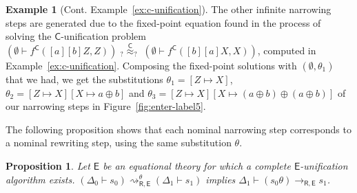 \documentclass[submission,copyright,creativecommons]{eptcs}
\newcommand{\daniele}[1]{\textcolor{cyan}{#1}}
\newcommand{\dani}[1]{\textcolor{orange}{#1}}
\newcommand{\theory}[1]{\ensuremath{\mathsf{#1}}}
\theoremstyle{plain}
\newtheorem{proposition}[theorem]{Proposition}
\theoremstyle{definition}
\newtheorem{example}{Example}[section]
\theoremstyle{remark}
\begin{document}
\begin{example}[Cont. Example~\ref{ex:c-unification}]
The other infinite narrowing steps are generated due to the fixed-point equation found in the process of solving the \theory{C}-unification problem 
$(\emptyset\vdash f^\theory{C}([a][b]Z,Z)) \; _?{\overset{\theory{C}}{\approx}}_? \; (\emptyset\vdash  f^\theory{C}([b][a]X,X))$, computed in Example~\ref{ex:c-unification}.
Composing the fixed-point solutions with $(\emptyset, \theta_1)$ that we had, we get the substitutions $\theta_1 = [Z\mapsto X]$, $\theta_2 = [Z\mapsto X][X\mapsto a \oplus b]$ and $\theta_3 = [Z\mapsto X][X\mapsto (a \oplus b)\oplus(a \oplus b)]$ of our narrowing steps in Figure~\ref{fig:enter-label5}.
 
\end{example}










 
 The following proposition shows that each nominal narrowing step corresponds to a nominal rewriting step, using the same substitution $\theta$.

\begin{proposition}\label{prop:narrow-to-rewriting}
Let \theory{E} be an equational theory for which a complete \theory{E}-unification algorithm exists. $(\Delta_0\vdash s_0) \rightsquigarrow_{\theory{R,E}}^{\theta} (\Delta_1 \vdash s_1) $ implies $\Delta_1\vdash (s_0 \theta ) \rightarrow_{\theory{R,E}}  s_1 $.
\end{proposition}
\end{document}
